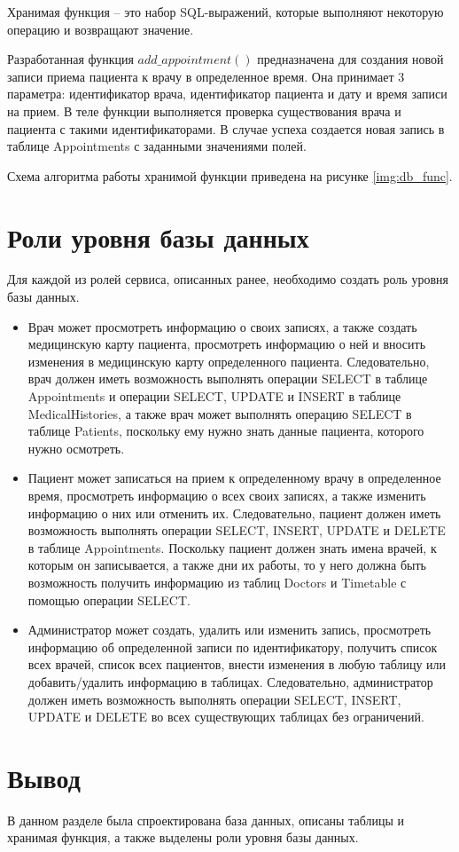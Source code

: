 Хранимая функция -- это набор SQL-выражений, которые выполняют некоторую операцию и возвращают значение.

Разработанная функция $add\_appointment()$ предназначена для создания новой записи приема пациента к врачу в определенное время.
Она принимает 3 параметра: идентификатор врача, идентификатор пациента и дату и время записи на прием.
В теле функции выполняется проверка существования врача и пациента с такими идентификаторами.
В случае успеха создается новая запись в таблице Appointments с заданными значениями полей.

Схема алгоритма работы хранимой функции приведена на рисунке \ref{img:db_func}.


\clearpage
\section{Роли уровня базы данных}
Для каждой из ролей сервиса, описанных ранее, необходимо создать роль уровня базы данных. 

\begin{itemize}
	\item Врач может просмотреть информацию о своих записях, а также создать медицинскую карту пациента, просмотреть информацию о ней и вносить изменения в медицинскую карту определенного пациента.
	Следовательно, врач должен иметь возможность выполнять операции SELECT в таблице Appointments и операции SELECT, UPDATE и INSERT в таблице MedicalHistories, а также врач может выполнять операцию SELECT в таблице Patients, поскольку ему нужно знать данные пациента, которого нужно осмотреть.
	\item Пациент может записаться на прием к определенному врачу в определенное время, просмотреть информацию о всех своих записях, а также изменить информацию о них или отменить их.
	Следовательно, пациент должен иметь возможность выполнять операции SELECT, INSERT, UPDATE и DELETE в таблице Appointments.
	Поскольку пациент должен знать имена врачей, к которым он записывается, а также дни их работы, то у него должна быть возможность получить информацию из таблиц Doctors и Timetable с помощью операции SELECT.
	\item Администратор может создать, удалить или изменить запись, просмотреть информацию об определенной записи по идентификатору, получить список всех врачей, список всех пациентов, внести изменения в любую таблицу или добавить/удалить информацию в таблицах.
	Следовательно, администратор должен иметь возможность выполнять операции SELECT, INSERT, UPDATE и DELETE во всех существующих таблицах без ограничений.
\end{itemize}

\section*{Вывод}
В данном разделе была спроектирована база данных, описаны таблицы и хранимая функция, а также выделены роли уровня базы данных.
